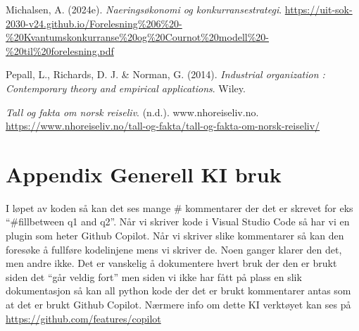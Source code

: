 \documentclass[
  12pt,
  a4paper,
  DIV=11,
  numbers=noendperiod]{scrartcl}
\newlength{\cslhangindent}
\newenvironment{CSLReferences}[2] %
 {\begin{list}{}{%
  \setlength{\itemindent}{0pt}
  \setlength{\leftmargin}{0pt}
  \setlength{\parsep}{0pt}
  \ifodd #1
   \setlength{\leftmargin}{\cslhangindent}
   \setlength{\itemindent}{-1\cslhangindent}
  \fi
  \setlength{\itemsep}{#2\baselineskip}}}
 {\end{list}}
\begin{document}
\begin{CSLReferences}{1}{0}
Michalsen, A. (2024e). \emph{Naeringsøkonomi og konkurransestrategi}.
\url{https://uit-sok-2030-v24.github.io/Forelesning\%206\%20-\%20Kvantumskonkurranse\%20og\%20Cournot\%20modell\%20-\%20til\%20forelesning.pdf}

Pepall, L., Richards, D. J. \& Norman, G. (2014). \emph{Industrial
organization : Contemporary theory and empirical applications}. Wiley.

\emph{Tall og fakta om norsk reiseliv}. (n.d.). www.nhoreiseliv.no.
\url{https://www.nhoreiseliv.no/tall-og-fakta/tall-og-fakta-om-norsk-reiseliv/}

\end{CSLReferences}

\appendix

\section {Appendix Generell KI bruk}

I løpet av koden så kan det ses mange \# kommentarer der det er skrevet
for eks ``\#fillbetween q1 and q2''. Når vi skriver kode i Visual Studio
Code så har vi en plugin som heter Github Copilot. Når vi skriver slike
kommentarer så kan den foresøke å fullføre kodelinjene mens vi skriver
de. Noen ganger klarer den det, men andre ikke. Det er vanskelig å
dokumentere hvert bruk der den er brukt siden det ``går veldig fort''
men siden vi ikke har fått på plass en slik dokumentasjon så kan all
python kode der det er brukt kommentarer antas som at det er brukt
Github Copilot. Nærmere info om dette KI verktøyet kan ses på
\url{https://github.com/features/copilot}
\end{document}
